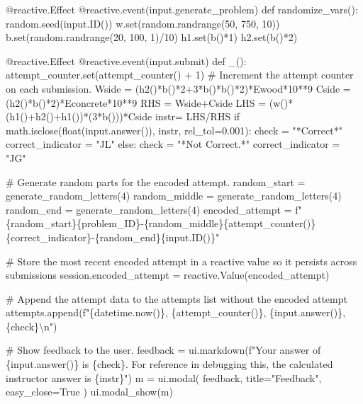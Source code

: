 \documentclass[
  letterpaper,
  DIV=11,
  numbers=noendperiod]{scrreprt}
\newenvironment{Shaded}{\begin{snugshade}}{\end{snugshade}}
\newcommand{\NormalTok}[1]{\textcolor[rgb]{0.00,0.23,0.31}{#1}}
\begin{document}
\begin{Shaded}
\begin{Highlighting}[]
\NormalTok{    @reactive.Effect}
\NormalTok{    @reactive.event(input.generate\_problem)}
\NormalTok{    def randomize\_vars():}
\NormalTok{        random.seed(input.ID())}
\NormalTok{        w.set(random.randrange(50, 750, 10))}
\NormalTok{        b.set(random.randrange(20, 100, 1)/10)}
\NormalTok{        h1.set(b()*1)}
\NormalTok{        h2.set(b()*2)}
        
\NormalTok{    @reactive.Effect}
\NormalTok{    @reactive.event(input.submit)}
\NormalTok{    def \_():}
\NormalTok{        attempt\_counter.set(attempt\_counter() + 1)  \# Increment the attempt counter on each submission.}
\NormalTok{        Wside = (h2()*b()*2+3*b()*b()*2)*Ewood*10**9}
\NormalTok{        Cside = (h2()*b()*2)*Econcrete*10**9}
\NormalTok{        RHS = Wside+Cside}
\NormalTok{        LHS = (w()*(h1()+h2()+h1())*(3*b()))*Cside}
\NormalTok{        instr= LHS/RHS}
\NormalTok{        if math.isclose(float(input.answer()), instr, rel\_tol=0.001):}
\NormalTok{            check = "*Correct*"}
\NormalTok{            correct\_indicator = "JL"}
\NormalTok{        else:}
\NormalTok{            check = "*Not Correct.*"}
\NormalTok{            correct\_indicator = "JG"}

\NormalTok{        \# Generate random parts for the encoded attempt.}
\NormalTok{        random\_start = generate\_random\_letters(4)}
\NormalTok{        random\_middle = generate\_random\_letters(4)}
\NormalTok{        random\_end = generate\_random\_letters(4)}
\NormalTok{        encoded\_attempt = f"\{random\_start\}\{problem\_ID\}{-}\{random\_middle\}\{attempt\_counter()\}\{correct\_indicator\}{-}\{random\_end\}\{input.ID()\}"}

\NormalTok{        \# Store the most recent encoded attempt in a reactive value so it persists across submissions}
\NormalTok{        session.encoded\_attempt = reactive.Value(encoded\_attempt)}

\NormalTok{        \# Append the attempt data to the attempts list without the encoded attempt}
\NormalTok{        attempts.append(f"\{datetime.now()\}, \{attempt\_counter()\}, \{input.answer()\}, \{check\}\textbackslash{}n")}

\NormalTok{        \# Show feedback to the user.}
\NormalTok{        feedback = ui.markdown(f"Your answer of \{input.answer()\} is \{check\}. For reference in debugging this, the calculated instructor answer is \{instr\}")}
\NormalTok{        m = ui.modal(}
\NormalTok{            feedback,}
\NormalTok{            title="Feedback",}
\NormalTok{            easy\_close=True}
\NormalTok{        )}
\NormalTok{        ui.modal\_show(m)}


\end{Highlighting}
\end{Shaded}
\end{document}
